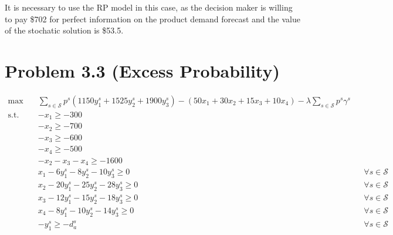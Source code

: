 \documentclass[7pt]{article}
\begin{document}
It is necessary to use the RP model in this case, as the decision maker is
willing to pay \$702 for perfect information on the product demand forecast and
the value of the stochatic solution is \$53.5.

\section{Problem 3.3 (Excess Probability)}

\begin{align*}
    \max \quad
     & \sum_{s \in \mathcal{S}} p^s \left(1150y_1^s + 1525y_2^s + 1900 y_3^s \right)
    - \left(50 x_1 + 30 x_2 + 15 x_3 + 10 x_4 \right) - \lambda\sum_{s \in \mathcal{S}}p^s\gamma^s                                   \\
    \text{s.t.} \quad
     & -x_1 \geq -300                                                                                                                \\
     & -x_2 \geq -700                                                                                                                \\
     & -x_3 \geq -600                                                                                                                \\
     & -x_4 \geq -500                                                                                                                \\
     & -x_2 - x_3 - x_4 \geq -1600                                                                                                   \\
     & x_1 - 6 y_1^s - 8 y_2^s - 10 y_3^s \geq 0 \quad                                                &  & \forall s \in \mathcal{S} \\
     & x_2 - 20 y_1^s - 25 y_2^s - 28 y_3^s \geq 0 \quad                                              &  & \forall s \in \mathcal{S} \\
     & x_3 - 12 y_1^s - 15 y_2^s - 18 y_3^s \geq 0 \quad                                              &  & \forall s \in \mathcal{S} \\
     & x_4 - 8 y_1^s - 10 y_2^s - 14 y_3^s \geq 0 \quad                                               &  & \forall s \in \mathcal{S} \\
     & -y_1^s \geq -d_a^s                                                                             &  & \forall s \in \mathcal{S} \\

\end{align*}
\end{document}
